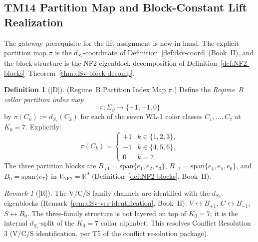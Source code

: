 \documentclass[12pt,oneside]{amsbook}
\theoremstyle{plain}
\theoremstyle{definition}
\newtheorem{definition}[theorem]{Definition}
\theoremstyle{remark}
\newtheorem{remark}[theorem]{Remark}
\newcommand{\status}[1]{\textup{[#1]}}
\begin{document}
\subsection{TM14 Partition Map and Block-Constant Lift Realization}

The gateway prerequisite for the lift assignment is now in hand.
The explicit partition map $\pi$ is the $d_{S_v}$-coordinate
of Definition~\ref{def:dsv-coord} (Book~II), and the block structure
is the NF2 eigenblock decomposition of
Definition~\ref{def:NF2-blocks}--Theorem~\ref{thm:dSv-block-decomp}.

\begin{definition}[\status{D}]\label{def:pi-partition-map}
\textup{(Regime~B Partition Index Map $\pi$.)}
Define the \emph{Regime~B collar partition index map}
\[
 \pi : \Sigma_\partial \to \{+1,-1,0\}
\]
by $\pi(C_k) := d_{S_v}(C_k)$ for each of the seven WL-1 color
classes $C_1,\ldots,C_7$ at $K_0=7$. Explicitly:
\[
 \pi(C_k) = \begin{cases}
 +1 & k \in \{1,2,3\},\\
 -1 & k \in \{4,5,6\},\\
 0 & k = 7.
 \end{cases}
\]
The three partition blocks are
$B_{+1} = \mathrm{span}\{e_1,e_2,e_3\}$,
$B_{-1} = \mathrm{span}\{e_4,e_5,e_6\}$, and
$B_0 = \mathrm{span}\{e_7\}$
in $V_{\mathrm{NF2}} = \mathbb{R}^9$
(Definition~\ref{def:NF2-blocks}, Book~II).
\end{definition}

\begin{remark}[\status{R}]
The V/C/S family channels are identified with the $d_{S_v}$-eigenblocks
(Remark~\ref{rem:dSv-vcs-identification}, Book~II):
$V \leftrightarrow B_{+1}$, $C \leftrightarrow B_{-1}$,
$S \leftrightarrow B_0$. The three-family structure is not layered
on top of $K_0=7$; it is the internal $d_{S_v}$-split of the
$K_0=7$ collar alphabet. This resolves Conflict Resolution 3
(V/C/S identification, per T5 of the conflict resolution package).
\end{remark}
\end{document}
